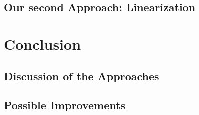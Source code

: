\section{Our second Approach: Linearization}

\chapter{Conclusion}
\section{Discussion of the Approaches}
\section{Possible Improvements}

\appendix

\nocite{*}
\printbibliography
\listoffigures
\listoftables
\listoflistings


